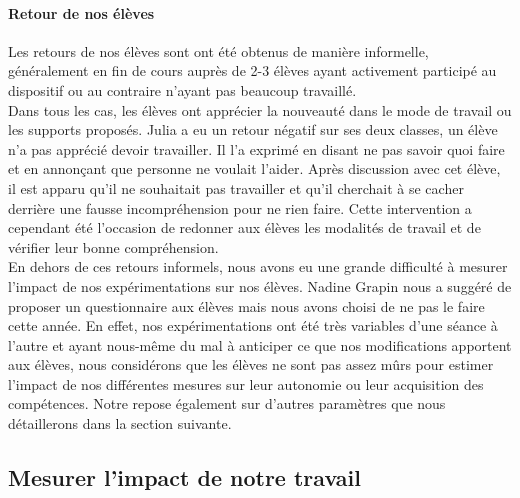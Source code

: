 \paragraph*{Retour de nos élèves}
Les retours de nos élèves sont ont été obtenus de manière informelle, généralement en fin de cours auprès de 2-3 élèves ayant activement participé au dispositif ou au contraire n'ayant pas beaucoup travaillé.  \\
Dans tous les cas, les élèves ont apprécier la nouveauté dans le mode de travail ou les supports proposés. Julia a eu un retour négatif sur ses deux classes, un élève n'a pas apprécié devoir travailler. Il l'a exprimé en disant ne pas savoir quoi faire et en annonçant que personne ne voulait l'aider. Après discussion avec cet élève, il est apparu qu'il ne souhaitait pas travailler et qu'il cherchait à se cacher derrière une fausse incompréhension pour ne rien faire. Cette intervention a cependant été l'occasion de redonner aux élèves les modalités de travail et de vérifier leur bonne compréhension.\\
En dehors de ces retours informels, nous avons eu une grande difficulté à mesurer l'impact de nos expérimentations sur nos élèves. Nadine Grapin nous a suggéré de proposer un questionnaire aux élèves mais nous avons choisi de ne pas le faire cette année. En effet, nos expérimentations ont été très variables d'une séance à l'autre et ayant nous-même du mal à anticiper ce que nos modifications apportent aux élèves, nous considérons que les élèves ne sont pas assez mûrs pour estimer l'impact de nos différentes mesures sur leur autonomie ou leur acquisition des compétences. Notre repose également sur d'autres paramètres que nous détaillerons dans la section suivante.
\subsection{Mesurer l’impact de notre travail}
